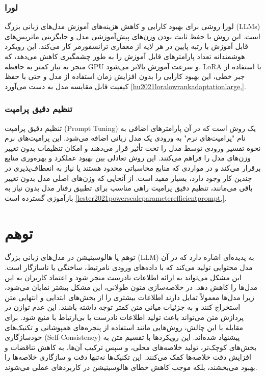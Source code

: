 \subsubsection{لورا}
لورا
روشی برای بهبود کارایی و کاهش هزینه‌های آموزش مدل‌های زبانی بزرگ (LLMs) است. این روش با حفظ ثابت بودن وزن‌های پیش‌آموزشی مدل و جایگزینی ماتریس‌های قابل آموزش با رتبه پایین در هر لایه از معماری ترانسفورمر کار می‌کند. این رویکرد هوشمندانه تعداد پارامترهای قابل آموزش را به طور چشمگیری کاهش می‌دهد، که منجر به نیاز کمتر به حافظه GPU و سرعت آموزش بالاتر می‌شود. LoRA با استفاده از جبر خطی، این بهبود کارایی را بدون افزایش زمان استفاده از مدل و حتی با حفظ کیفیت قابل مقایسه مدل به دست می‌آورد
\ref{hu2021loralowrankadaptationlarge,}.

\subsubsection{تنظیم دقیق پرامپت}
تنظیم دقیق پرامپت (Prompt Tuning) یک روش است که در آن پارامترهای اضافی به نام "پرامپت‌های نرم" به ورودی یک مدل زبانی اضافه می‌شود. این پرامپت‌های نرم نحوه تفسیر ورودی توسط مدل را تحت تأثیر قرار می‌دهند و امکان تنظیمات بدون تغییر وزن‌های مدل را فراهم می‌کنند. این روش تعادلی بین بهبود عملکرد و بهره‌وری منابع برقرار می‌کند و در مواردی که منابع محاسباتی محدود هستند یا نیاز به انعطاف‌پذیری در چندین کار وجود دارد، بسیار مفید است. از آنجایی که وزن‌های اصلی مدل بدون تغییر باقی می‌مانند، تنظیم دقیق پرامپت راهی مناسب برای تطبیق رفتار مدل بدون نیاز به بازآموزی گسترده است
\ref{lester2021powerscaleparameterefficientprompt,}.



\section{توهم}
توهم یا هالوسینیشن
  در مدل‌های زبانی بزرگ (LLM) به پدیده‌ای اشاره دارد که در آن مدل محتوایی تولید می‌کند که با داده‌های ورودی نامرتبط، ساختگی یا ناسازگار است. این مشکل می‌تواند به ارائه اطلاعات نادرست منجر شود و اعتماد کاربران به این مدل‌ها را کاهش دهد. در خلاصه‌سازی متون طولانی، این مشکل بیشتر نمایان می‌شود، زیرا مدل‌ها معمولاً تمایل دارند اطلاعات بیشتری را از بخش‌های ابتدایی و انتهایی متن استخراج کنند و به جزئیات میانی متن کمتر توجه داشته باشند. این عدم توازن در پردازش متن می‌تواند باعث تولید اطلاعات نادرست یا بی‌ارتباط با منبع شود. برای مقابله با این چالش، روش‌هایی مانند استفاده از پنجره‌های همپوشانی و تکنیک‌های خودسازگاری (Self-Consistency) پیشنهاد شده‌اند. این رویکردها با تقسیم متن به بخش‌های کوچک‌تر، تولید خلاصه‌های محلی، و سپس ترکیب آن‌ها، به کاهش تناقضات و افزایش دقت خلاصه‌ها کمک می‌کنند. این تکنیک‌ها نه‌تنها دقت و سازگاری خلاصه‌ها را بهبود می‌بخشند، بلکه موجب کاهش خطای هالوسینیشن در کاربردهای عملی می‌شوند.

